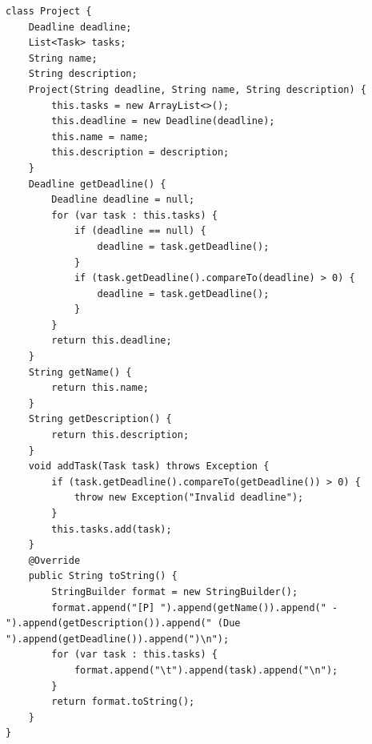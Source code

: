 \documentclass[14pt]{extreport}
\begin{document}
\begin{normalsize}
\begin{lstlisting}
class Project {
	Deadline deadline;
	List<Task> tasks;
	String name;
	String description;
	Project(String deadline, String name, String description) {
		this.tasks = new ArrayList<>();
		this.deadline = new Deadline(deadline);
		this.name = name;
		this.description = description;
	}
	Deadline getDeadline() {
		Deadline deadline = null;
		for (var task : this.tasks) {
			if (deadline == null) {
				deadline = task.getDeadline();
			}
			if (task.getDeadline().compareTo(deadline) > 0) {
				deadline = task.getDeadline();
			}
		}
		return this.deadline;
	}
	String getName() {
		return this.name;
	}
	String getDescription() {
		return this.description;
	}
	void addTask(Task task) throws Exception {
		if (task.getDeadline().compareTo(getDeadline()) > 0) {
			throw new Exception("Invalid deadline");
		}
		this.tasks.add(task);
	}
	@Override
	public String toString() {
		StringBuilder format = new StringBuilder();
		format.append("[P] ").append(getName()).append(" - ").append(getDescription()).append(" (Due ").append(getDeadline()).append(")\n");
		for (var task : this.tasks) {
			format.append("\t").append(task).append("\n");
		}
		return format.toString();
	}
}


\end{lstlisting}
\end{normalsize}
\end{document}
